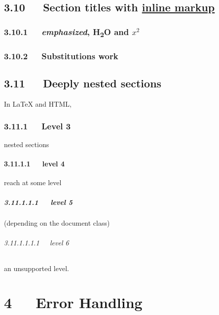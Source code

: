 \documentclass[a4paper]{memoir}
\begin{document}
\section{3.10   Section titles with \hyperref[inline-markup]{inline markup}%
  \label{section-titles-with-inline-markup}%
}


\subsection{3.10.1   \emph{emphasized}, H\textsubscript{2}O and $x^2$%
  \label{emphasized-h2o-and-x-2}%
}


\subsection{3.10.2   Substitutions work%
  \label{substitutions-fail}%
}


\section{3.11   Deeply nested sections%
  \label{deeply-nested-sections}%
}

In LaTeX and HTML,


\subsection{3.11.1   Level 3%
  \label{level-3}%
}

nested sections


\subsubsection{3.11.1.1   level 4%
  \label{level-4}%
}

reach at some level


\paragraph{3.11.1.1.1   level 5%
  \label{level-5}%
}

(depending on the document class)


\subparagraph{3.11.1.1.1.1   level 6%
  \label{level-6}%
}

an unsupported level.




\chapter{4   Error Handling%
  \label{error-handling}%
}
\end{document}
